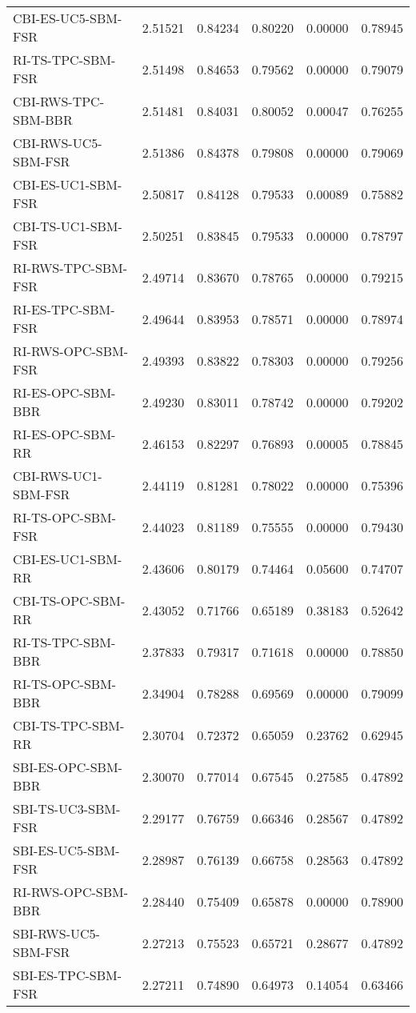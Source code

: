 \begin{tabular}{lrrrrr}
CBI-ES-UC5-SBM-FSR & 2.51521 & 0.84234 & 0.80220 & 0.00000 & 0.78945 \\
RI-TS-TPC-SBM-FSR & 2.51498 & 0.84653 & 0.79562 & 0.00000 & 0.79079 \\
CBI-RWS-TPC-SBM-BBR & 2.51481 & 0.84031 & 0.80052 & 0.00047 & 0.76255 \\
CBI-RWS-UC5-SBM-FSR & 2.51386 & 0.84378 & 0.79808 & 0.00000 & 0.79069 \\
CBI-ES-UC1-SBM-FSR & 2.50817 & 0.84128 & 0.79533 & 0.00089 & 0.75882 \\
CBI-TS-UC1-SBM-FSR & 2.50251 & 0.83845 & 0.79533 & 0.00000 & 0.78797 \\
RI-RWS-TPC-SBM-FSR & 2.49714 & 0.83670 & 0.78765 & 0.00000 & 0.79215 \\
RI-ES-TPC-SBM-FSR & 2.49644 & 0.83953 & 0.78571 & 0.00000 & 0.78974 \\
RI-RWS-OPC-SBM-FSR & 2.49393 & 0.83822 & 0.78303 & 0.00000 & 0.79256 \\
RI-ES-OPC-SBM-BBR & 2.49230 & 0.83011 & 0.78742 & 0.00000 & 0.79202 \\
RI-ES-OPC-SBM-RR & 2.46153 & 0.82297 & 0.76893 & 0.00005 & 0.78845 \\
CBI-RWS-UC1-SBM-FSR & 2.44119 & 0.81281 & 0.78022 & 0.00000 & 0.75396 \\
RI-TS-OPC-SBM-FSR & 2.44023 & 0.81189 & 0.75555 & 0.00000 & 0.79430 \\
CBI-ES-UC1-SBM-RR & 2.43606 & 0.80179 & 0.74464 & 0.05600 & 0.74707 \\
CBI-TS-OPC-SBM-RR & 2.43052 & 0.71766 & 0.65189 & 0.38183 & 0.52642 \\
RI-TS-TPC-SBM-BBR & 2.37833 & 0.79317 & 0.71618 & 0.00000 & 0.78850 \\
RI-TS-OPC-SBM-BBR & 2.34904 & 0.78288 & 0.69569 & 0.00000 & 0.79099 \\
CBI-TS-TPC-SBM-RR & 2.30704 & 0.72372 & 0.65059 & 0.23762 & 0.62945 \\
SBI-ES-OPC-SBM-BBR & 2.30070 & 0.77014 & 0.67545 & 0.27585 & 0.47892 \\
SBI-TS-UC3-SBM-FSR & 2.29177 & 0.76759 & 0.66346 & 0.28567 & 0.47892 \\
SBI-ES-UC5-SBM-FSR & 2.28987 & 0.76139 & 0.66758 & 0.28563 & 0.47892 \\
RI-RWS-OPC-SBM-BBR & 2.28440 & 0.75409 & 0.65878 & 0.00000 & 0.78900 \\
SBI-RWS-UC5-SBM-FSR & 2.27213 & 0.75523 & 0.65721 & 0.28677 & 0.47892 \\
SBI-ES-TPC-SBM-FSR & 2.27211 & 0.74890 & 0.64973 & 0.14054 & 0.63466 \\

\end{tabular}
